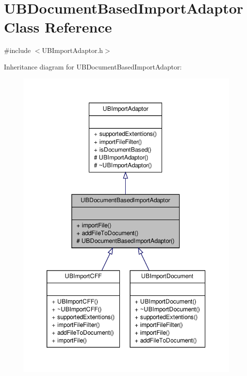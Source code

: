 \hypertarget{class_u_b_document_based_import_adaptor}{\section{U\-B\-Document\-Based\-Import\-Adaptor Class Reference}
\label{d3/df6/class_u_b_document_based_import_adaptor}
}


{\ttfamily \#include $<$U\-B\-Import\-Adaptor.\-h$>$}



Inheritance diagram for U\-B\-Document\-Based\-Import\-Adaptor\-:
\nopagebreak
\begin{figure}[H]
\begin{center}
\leavevmode
\includegraphics[width=342pt]{d1/db9/class_u_b_document_based_import_adaptor__inherit__graph}
\end{center}
\end{figure}


